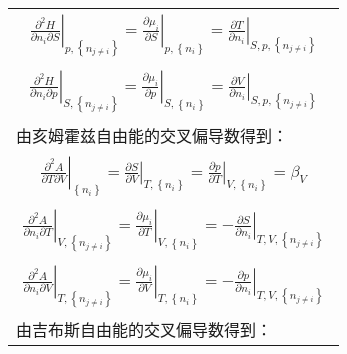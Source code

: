 \documentclass[main.tex]{subfiles}
\begin{document}
\begin{longtable}{m{}}
  \begin{align}\left.\frac{\partial ^2H}{\partial n_i\partial S}\right|_{p,\left\{n_{j\neq i}\right\}}  =\left.\frac{\partial \mu_i}{\partial S}\right|_{p,\left\{n_i\right\}}=\left.\frac{\partial T}{\partial n_i}\right|_{S,p,\left\{n_{j\neq i}\right\}}\label{eq:I.1_Maxwell_HnS}\end{align}  \\[-8ex]
  \begin{align}\left.\frac{\partial ^2H}{\partial n_i\partial p}\right|_{S,\left\{n_{j\neq i}\right\}}  =\left.\frac{\partial \mu_i}{\partial p}\right|_{S,\left\{n_i\right\}}=\left.\frac{\partial V}{\partial n_i}\right|_{S,p,\left\{n_{j\neq i}\right\}}\label{eq:I.1_Maxwell_Hnp}\end{align}  \\
  由亥姆霍兹自由能的交叉偏导数得到：                                                                                                                                                                                                                                                                                \\ [-4ex]
  \begin{align}
    \left.\frac{\partial^2 A}{\partial T\partial V}\right|_{\left\{n_i\right\}}              =\left.\frac{\partial S}{\partial V}\right|_{T,\left\{n_i\right\}}=\left.\frac{\partial p}{\partial T}\right|_{V,\left\{n_i\right\}}=\beta_V\label{eq:I.1_Maxwell_ATV}\end{align}                       \\[-8ex]
  \begin{align}\left.\frac{\partial ^2A}{\partial n_i\partial T}\right|_{V,\left\{n_{j\neq i}\right\}}  =\left.\frac{\partial \mu_i}{\partial T}\right|_{V,\left\{n_i\right\}}=-\left.\frac{\partial S}{\partial n_i}\right|_{T,V,\left\{n_{j\neq i}\right\}}\label{eq:I.1_Maxwell_AnT}\end{align} \\[-8ex]
  \begin{align}\left.\frac{\partial ^2A}{\partial n_i\partial V}\right|_{T,\left\{n_{j\neq i}\right\}}  =\left.\frac{\partial \mu_i}{\partial V}\right|_{T,\left\{n_i\right\}}=-\left.\frac{\partial p}{\partial n_i}\right|_{T,V,\left\{n_{j\neq i}\right\}}\label{eq:I.1_Maxwell_AnV}\end{align} \\
  由吉布斯自由能的交叉偏导数得到：                                                                                                                                                                                                                                                                                 \\ [-4ex]

\end{longtable}
\end{document}
